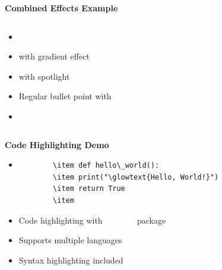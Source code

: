 \documentclass[aspectratio=169]{beamer}
\newcommand{\shadowtext}[2][2pt]{%
    \begin{tikzpicture}[baseline]
        \node[blur shadow={shadow blur steps=5,shadow xshift=0pt,shadow yshift=-#1,
              shadow opacity=0.75}, text=white] {#2};
    \end{tikzpicture}%
}
\newcommand{\glowtext}[2][myblue]{%
    \begin{tikzpicture}[baseline]
        \node[circle, inner sep=1pt,
              blur shadow={shadow blur steps=10,shadow xshift=0pt,
              shadow yshift=0pt,shadow blur radius=5pt,
              shadow opacity=0.5,shadow color=#1},
              text=white] {#2};
    \end{tikzpicture}%
}
\newcommand{\hlkey}[1]{\colorbox{myblue!20}{\textcolor{white}{\textbf{#1}}}}
\begin{document}
\begin{frame}{\Large\textbf{Combined Effects Example}}
\begin{columns}[T]
        \begin{column}{0.48\textwidth}
            \begin{itemize}
                \item {}
        \item {} with gradient effect
        \item {} with spotlight
        \item Regular bullet point with \hlkey{highlighted term}
        \item {}
            \end{itemize}
        \end{column}
    \end{columns}
\end{frame}

\begin{frame}{\Large\textbf{Code Highlighting Demo}}
    \vspace{0.5em}
    \begin{itemize}
        \item \begin{verbatim}
        \item def hello\_world():
        \item print("\glowtext{Hello, World!}")
        \item return True
        \item \end{verbatim}
        \item Code highlighting with \hlkey{minted} package
        \item Supports multiple languages
        \item Syntax highlighting included
    \end{itemize}
\end{frame}
\end{document}
